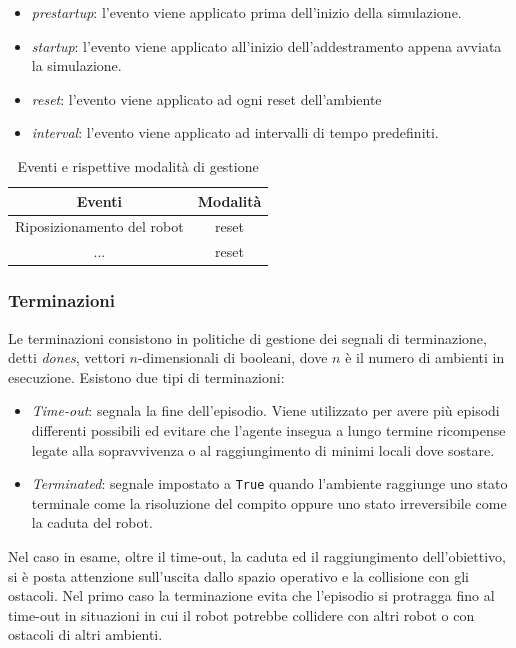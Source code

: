 \begin{itemize}
    \item \textit{prestartup}: l'evento viene applicato prima dell'inizio della simulazione.
    \item \textit{startup}: l'evento viene applicato all'inizio dell'addestramento appena avviata la simulazione.
    \item \textit{reset}: l'evento viene applicato ad ogni reset dell'ambiente
    \item \textit{interval}: l'evento viene applicato ad intervalli di tempo predefiniti.
\end{itemize}

\begin{table}[h!]
    \centering
    \begin{tabular}{|c|c|}
    \hline
    \textbf{Eventi} & \textbf{Modalità} \\ \hline
    Riposizionamento del robot & reset \\ \hline
    ... & reset \\ \hline
    \end{tabular}
    \caption{Eventi e rispettive modalità di gestione}
    \label{tab:ev}
\end{table}


\subsubsection{Terminazioni}
Le terminazioni consistono in politiche di gestione dei segnali di terminazione, detti \textit{dones}, vettori $n$-dimensionali di booleani, dove $n$ è il numero di ambienti in esecuzione. Esistono due tipi di terminazioni:

\begin{itemize}
    \item \textit{Time-out}: segnala la fine dell'episodio. Viene utilizzato per avere più episodi differenti possibili ed evitare che l'agente insegua a lungo termine ricompense legate alla sopravvivenza o al raggiungimento di minimi locali dove sostare.
    \item \textit{Terminated}: segnale impostato a \texttt{True} quando l'ambiente raggiunge uno stato terminale come la risoluzione del compito oppure uno stato irreversibile come la caduta del robot.
\end{itemize}

Nel caso in esame, oltre il time-out, la caduta ed il raggiungimento dell'obiettivo, si è posta attenzione sull'uscita dallo spazio operativo e la collisione con gli ostacoli. Nel primo caso la terminazione evita che l'episodio si protragga fino al time-out in situazioni in cui il robot potrebbe collidere con altri robot o con ostacoli di altri ambienti. 

